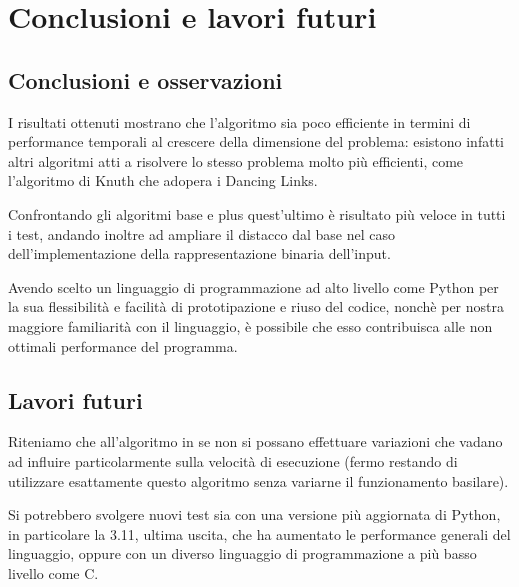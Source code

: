 \chapter{Conclusioni e lavori futuri}
\section{Conclusioni e osservazioni}
I risultati ottenuti mostrano che l’algoritmo sia poco efficiente in termini di performance temporali al crescere della dimensione del problema: esistono infatti altri algoritmi atti a risolvere lo stesso problema molto più efficienti, come l’algoritmo di Knuth che adopera i Dancing Links.

Confrontando gli algoritmi base e plus quest’ultimo è risultato più veloce in tutti i test, andando inoltre ad ampliare il distacco dal base nel caso dell’implementazione della rappresentazione binaria dell’input.

Avendo scelto un linguaggio di programmazione ad alto livello come Python per la sua flessibilità e facilità di prototipazione e riuso del codice, nonchè per nostra maggiore familiarità con il linguaggio, è possibile che esso contribuisca alle non ottimali performance del programma.

\section{Lavori futuri}
Riteniamo che all’algoritmo in se non si possano effettuare variazioni che vadano ad influire particolarmente sulla velocità di esecuzione (fermo restando di utilizzare esattamente questo algoritmo senza variarne il funzionamento basilare).

Si potrebbero svolgere nuovi test sia con una versione più aggiornata di Python, in particolare la 3.11, ultima uscita, che ha aumentato le performance generali del linguaggio, oppure con un diverso linguaggio di programmazione a più basso livello come C.
